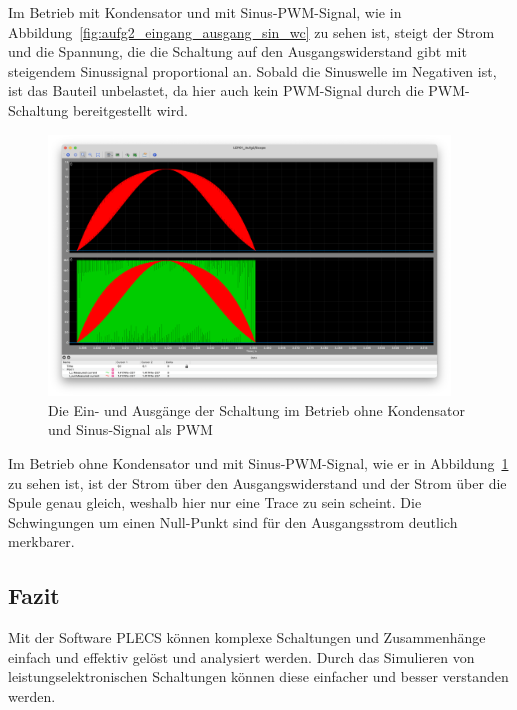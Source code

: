 \documentclass{report}
\begin{document}
Im Betrieb mit Kondensator und mit Sinus-PWM-Signal, wie in Abbildung~\ref{fig:aufg2_eingang_ausgang_sin_wc} zu sehen ist, steigt der Strom und die Spannung, die die Schaltung auf den Ausgangswiderstand gibt mit steigendem Sinussignal proportional an. Sobald die Sinuswelle im Negativen ist, ist das Bauteil unbelastet, da hier auch kein PWM-Signal durch die PWM-Schaltung bereitgestellt wird.

\begin{figure}[hbt!]
	\begin{center}
		\includegraphics[width=0.95\textwidth]{assets/img/aufg2_eingang_ausgang_sin_nc.png}
	\end{center}
	\caption{Die Ein- und Ausgänge der Schaltung im Betrieb ohne Kondensator und Sinus-Signal als PWM}
	\label{fig:aufg2_eingang_ausgang_sin_nc}
\end{figure}

Im Betrieb ohne Kondensator und mit Sinus-PWM-Signal, wie er in Abbildung~\ref{fig:aufg2_eingang_ausgang_sin_nc} zu sehen ist, ist der Strom über den Ausgangswiderstand und der Strom über die Spule genau gleich, weshalb hier nur eine Trace zu sein scheint. Die Schwingungen um einen Null-Punkt sind für den Ausgangsstrom deutlich merkbarer.


\subsection{Fazit}
\label{sec:fazit}

Mit der Software PLECS können komplexe Schaltungen und Zusammenhänge einfach und effektiv gelöst und analysiert werden. Durch das Simulieren von leistungselektronischen Schaltungen können diese einfacher und besser verstanden werden.
\end{document}
